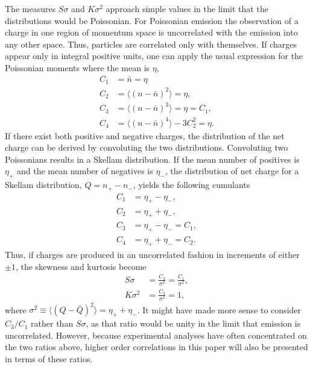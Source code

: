 \documentclass[aps,prc,nofootinbib,showpacs,superscriptaddress,groupedaddress]{revtex4-1}
\begin{document}
The measures $S\sigma$ and $K\sigma^2$ approach simple values in the limit that the distributions would be Poissonian. For Poissonian emission the observation of a charge in one region of momentum space is uncorrelated with the emission into any other space. Thus, particles are correlated only with themselves. If charges appear only in integral positive units, one can apply the usual expression for the Poissonian moments where the mean is $\eta$, 
\begin{eqnarray}
C_1&=\bar{n}=\eta\\
C_2&=\langle(n-\bar{n})^2\rangle=\eta,\\
C_3&=\langle(n-\bar{n})^3\rangle=\eta=C_1,\\
C_4&=\langle(n-\bar{n})^4\rangle-3C_2^2=\eta.
\end{eqnarray}
If there exist both positive and negative charges, the distribution of the net charge can be derived by convoluting the two distributions. Convoluting two Poissonians results in a Skellam distribution. If the mean number of positives is $\eta_+$ and the mean number of negatives is $\eta_-$, the distribution of net charge for a Skellam distribution, $Q=n_+-n_-$, yields the following cumulants
\begin{eqnarray}
C_1&=\eta_+-\eta_-,\\
C_2&=\eta_++\eta_-,\\
C_3&=\eta_+-\eta_-=C_1,\\
C_4&=\eta_++\eta_-=C_2.
\end{eqnarray}
Thus, if charges are produced in an uncorrelated fashion in increments of either $\pm 1$, the skewness and kurtosis become
\begin{eqnarray}
S\sigma&=\frac{C_3}{\sigma^2}=\frac{C_1}{\sigma^2},\\
K\sigma^2&=\frac{C_4}{\sigma^2}=1,
\end{eqnarray}
where $\sigma^2\equiv\langle(Q-\bar{Q})^2\rangle=\eta_++\eta_-$. It might have made more sense to consider $C_3/C_1$ rather than $S\sigma$, as that ratio would be unity in the limit that emission is uncorrelated. However, because experimental analyses have often concentrated on the two ratios above, higher order correlations in this paper will also be presented in terms of these ratios.
\end{document}
